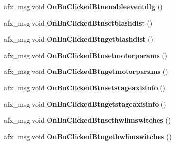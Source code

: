 \begin{DoxyCompactItemize}
\item 
afx\+\_\+msg void {\bfseries On\+Bn\+Clicked\+Btnenableeventdlg} ()\hypertarget{class_c_a_p_t_d_l_l_client_dlg_ac07036741773e7f803b4f2146d584628}{}\label{class_c_a_p_t_d_l_l_client_dlg_ac07036741773e7f803b4f2146d584628}

\item 
afx\+\_\+msg void {\bfseries On\+Bn\+Clicked\+Btnsetblashdist} ()\hypertarget{class_c_a_p_t_d_l_l_client_dlg_a3f675fdfd6f2e77d65d838eccaee5889}{}\label{class_c_a_p_t_d_l_l_client_dlg_a3f675fdfd6f2e77d65d838eccaee5889}

\item 
afx\+\_\+msg void {\bfseries On\+Bn\+Clicked\+Btngetblashdist} ()\hypertarget{class_c_a_p_t_d_l_l_client_dlg_ab521cdbf2118bac31454fafd69789498}{}\label{class_c_a_p_t_d_l_l_client_dlg_ab521cdbf2118bac31454fafd69789498}

\item 
afx\+\_\+msg void {\bfseries On\+Bn\+Clicked\+Btnsetmotorparams} ()\hypertarget{class_c_a_p_t_d_l_l_client_dlg_a6c60ba1b54eb35f520150144d503c41d}{}\label{class_c_a_p_t_d_l_l_client_dlg_a6c60ba1b54eb35f520150144d503c41d}

\item 
afx\+\_\+msg void {\bfseries On\+Bn\+Clicked\+Btngetmotorparams} ()\hypertarget{class_c_a_p_t_d_l_l_client_dlg_a7bb773b679789ae155beb151ac92d35d}{}\label{class_c_a_p_t_d_l_l_client_dlg_a7bb773b679789ae155beb151ac92d35d}

\item 
afx\+\_\+msg void {\bfseries On\+Bn\+Clicked\+Btnsetstageaxisinfo} ()\hypertarget{class_c_a_p_t_d_l_l_client_dlg_adb0e1a58464cb188eb4f14cf106e734c}{}\label{class_c_a_p_t_d_l_l_client_dlg_adb0e1a58464cb188eb4f14cf106e734c}

\item 
afx\+\_\+msg void {\bfseries On\+Bn\+Clicked\+Btngetstageaxisinfo} ()\hypertarget{class_c_a_p_t_d_l_l_client_dlg_a8018d4214b0843a60c8993ddb87abf88}{}\label{class_c_a_p_t_d_l_l_client_dlg_a8018d4214b0843a60c8993ddb87abf88}

\item 
afx\+\_\+msg void {\bfseries On\+Bn\+Clicked\+Btnsethwlimswitches} ()\hypertarget{class_c_a_p_t_d_l_l_client_dlg_abfc9c0a429c699b45ed502a0816d8deb}{}\label{class_c_a_p_t_d_l_l_client_dlg_abfc9c0a429c699b45ed502a0816d8deb}

\item 
afx\+\_\+msg void {\bfseries On\+Bn\+Clicked\+Btngethwlimswitches} ()\hypertarget{class_c_a_p_t_d_l_l_client_dlg_af9d68cc92d3205f6a3eec2017046e80a}{}\label{class_c_a_p_t_d_l_l_client_dlg_af9d68cc92d3205f6a3eec2017046e80a}


\end{DoxyCompactItemize}
